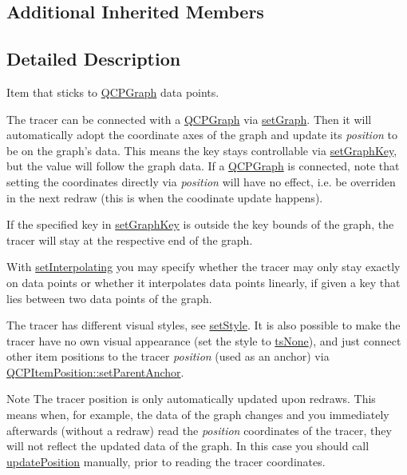 \subsection*{Additional Inherited Members}


\subsection{Detailed Description}
Item that sticks to \hyperlink{classQCPGraph}{Q\-C\-P\-Graph} data points. 

 The tracer can be connected with a \hyperlink{classQCPGraph}{Q\-C\-P\-Graph} via \hyperlink{classQCPItemTracer_af5886f4ded8dd68cb4f3388f390790c0}{set\-Graph}. Then it will automatically adopt the coordinate axes of the graph and update its {\itshape position} to be on the graph's data. This means the key stays controllable via \hyperlink{classQCPItemTracer_a6840143b42f3b685cedf7c6d83a704c8}{set\-Graph\-Key}, but the value will follow the graph data. If a \hyperlink{classQCPGraph}{Q\-C\-P\-Graph} is connected, note that setting the coordinates directly via {\itshape position} will have no effect, i.\-e. be overriden in the next redraw (this is when the coodinate update happens).

If the specified key in \hyperlink{classQCPItemTracer_a6840143b42f3b685cedf7c6d83a704c8}{set\-Graph\-Key} is outside the key bounds of the graph, the tracer will stay at the respective end of the graph.

With \hyperlink{classQCPItemTracer_a6c244a9d1175bef12b50afafd4f5fcd2}{set\-Interpolating} you may specify whether the tracer may only stay exactly on data points or whether it interpolates data points linearly, if given a key that lies between two data points of the graph.

The tracer has different visual styles, see \hyperlink{classQCPItemTracer_a41a2ac4f1acd7897b4e2a2579c03204e}{set\-Style}. It is also possible to make the tracer have no own visual appearance (set the style to \hyperlink{classQCPItemTracer_a2f05ddb13978036f902ca3ab47076500aac27462c79146225bfa8fba24d2ee8a4}{ts\-None}), and just connect other item positions to the tracer {\itshape position} (used as an anchor) via \hyperlink{classQCPItemPosition_ac094d67a95d2dceafa0d50b9db3a7e51}{Q\-C\-P\-Item\-Position\-::set\-Parent\-Anchor}.

\begin{DoxyNote}{Note}
The tracer position is only automatically updated upon redraws. This means when, for example, the data of the graph changes and you immediately afterwards (without a redraw) read the {\itshape position} coordinates of the tracer, they will not reflect the updated data of the graph. In this case you should call \hyperlink{classQCPItemTracer_a5b90296109e36384aedbc8908a670413}{update\-Position} manually, prior to reading the tracer coordinates. 
\end{DoxyNote}



